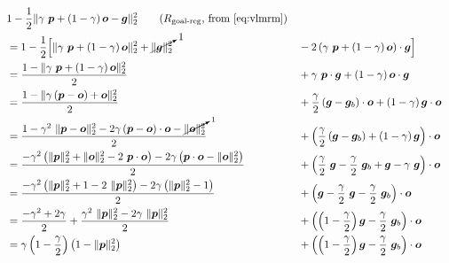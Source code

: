 \begin{align}
    &1 - \dfrac{1}{2} \norm{\gamma\ \bmp + \left(1 - \gamma\right) \bmo - \bmg}^2_2 \tag{\(R_{\text{goal-reg}}\), from \ref{eq:vlmrm}}\\
    \label{eq:vlmrm-equivalence-start}
    &= 1 - \dfrac{1}{2} \Big[\norm{\gamma\ \bmp + \left(1 - \gamma\right) \bmo}^2_2 + \cancelto{1}{\norm{\bmg}^2_2} &&- 2 \left(\gamma\ \bmp + \left(1 - \gamma\right) \bmo\right) \cdot \bmg\Big]\\
    &= \dfrac{1 - \norm{\gamma\ \bmp + \left(1 - \gamma\right) \bmo}^2_2}{2} &&+ \gamma\ \bmp \cdot \bmg + \left(1 - \gamma\right) \bmo \cdot \bmg\\
    &= \dfrac{1 - \norm{\gamma \left(\bmp - \bmo\right) + \bmo}^2_2}{2} &&+ \dfrac{\gamma}{2} \left(\bmg - \bmg_b\right) \cdot \bmo + \left(1 - \gamma\right) \bmg \cdot \bmo\\
    &= \dfrac{1 - \gamma^2\ \norm{\bmp - \bmo}^2_2 - 2 \gamma \left(\bmp - \bmo\right) \cdot \bmo - \cancelto{1}{\norm{\bmo}^2_2}}{2} &&+ \left(\dfrac{\gamma}{2} \left(\bmg - \bmg_b\right) + \left(1 - \gamma\right) \bmg\right) \cdot \bmo\\
    &= \dfrac{-\gamma^2 \left(\norm{\bmp}^2_2 + \norm{\bmo}^2_2 - 2\ \bmp \cdot \bmo\right) - 2 \gamma \left(\bmp \cdot \bmo - \norm{\bmo}^2_2\right)}{2} &&+ \left(\dfrac{\gamma}{2}\ \bmg - \dfrac{\gamma}{2}\ \bmg_b + \bmg - \gamma\ \bmg\right) \cdot \bmo\\
    &= \dfrac{-\gamma^2 \left(\norm{\bmp}^2_2 + 1 - 2\ \norm{\bmp}^2_2\right) - 2 \gamma \left(\norm{\bmp}^2_2 - 1\right)}{2} &&+ \left(\bmg - \dfrac{\gamma}{2}\ \bmg - \dfrac{\gamma}{2}\ \bmg_b\right) \cdot \bmo\\
    &= \dfrac{-\gamma^2 + 2\gamma}{2} + \dfrac{\gamma^2\ \norm{\bmp}^2_2 - 2 \gamma\ \norm{\bmp}^2_2}{2} &&+ \left(\left(1 - \dfrac{\gamma}{2}\right) \bmg - \dfrac{\gamma}{2}\ \bmg_b\right) \cdot \bmo\\ %
    &= \gamma\left(1 - \dfrac{\gamma}{2}\right)\left(1 -\norm{\bmp}^2_2\right) &&+ \left(\left(1 - \dfrac{\gamma}{2}\right) \bmg - \dfrac{\gamma}{2}\ \bmg_b\right) \cdot \bmo\\

\end{align}
